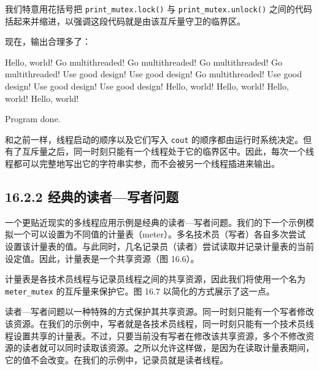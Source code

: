 我们特意用花括号把 \texttt{print\_\allowbreak{}mutex.\allowbreak{}lock(\allowbreak{})\allowbreak{}} 与 \texttt{print\_\allowbreak{}mutex.\allowbreak{}unlock(\allowbreak{})\allowbreak{}} 之间的代码括起来并缩进，以强调这段代码就是由该互斥量守卫的临界区。

现在，输出合理多了：

\begin{codebox}
Hello, world!
Go multithreaded!
Go multithreaded!
Go multithreaded!
Go multithreaded!
Use good design!
Use good design!
Go multithreaded!
Use good design!
Use good design!
Use good design!
Hello, world!
Hello, world!
Hello, world!
Hello, world!

Program done.
\end{codebox}

和之前一样，线程启动的顺序以及它们写入 \texttt{cout} 的顺序都由运行时系统决定。但有了互斥量之后，同一时刻只能有一个线程处于它的临界区中。因此，每次一个线程都可以完整地写出它的字符串实参，而不会被另一个线程插进来输出。

\subsection{16.2.2 经典的读者—写者问题}

一个更贴近现实的多线程应用示例是经典的读者—写者问题。我们的下一个示例模拟一个可以设置为不同值的计量表（meter）。多名技术员（写者）各自多次尝试设置该计量表的值。与此同时，几名记录员（读者）尝试读取并记录计量表的当前设定值。因此，计量表是一个共享资源（图 16.6）。


计量表是各技术员线程与记录员线程之间的共享资源，因此我们将使用一个名为 \texttt{meter\_\allowbreak{}mutex} 的互斥量来保护它。图 16.7 以简化的方式展示了这一点。


读者—写者问题以一种特殊的方式保护其共享资源。同一时刻只能有一个写者修改该资源。在我们的示例中，写者就是各技术员线程，同一时刻只能有一个技术员线程设置共享的计量表。不过，只要当前没有写者在修改该共享资源，多个不修改资源的读者就可以同时读取该资源。之所以允许这样做，是因为在读取计量表期间，它的值不会改变。在我们的示例中，记录员就是读者线程。

